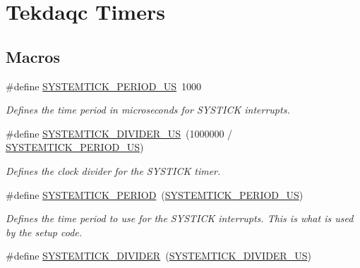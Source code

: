\hypertarget{group__tekdaqc__timers}{\section{Tekdaqc Timers}
\label{group__tekdaqc__timers}
}
\subsection*{Macros}
\begin{DoxyCompactItemize}
\item 
\hypertarget{group__tekdaqc__timers_gacc6f2ef6fc22ccd784d38b7de6f22492}{\#define \hyperlink{group__tekdaqc__timers_gacc6f2ef6fc22ccd784d38b7de6f22492}{S\-Y\-S\-T\-E\-M\-T\-I\-C\-K\-\_\-\-P\-E\-R\-I\-O\-D\-\_\-\-U\-S}~1000}\label{group__tekdaqc__timers_gacc6f2ef6fc22ccd784d38b7de6f22492}

\begin{DoxyCompactList}\small\item\em Defines the time period in microseconds for S\-Y\-S\-T\-I\-C\-K interrupts. \end{DoxyCompactList}\item 
\hypertarget{group__tekdaqc__timers_gad688df41f76297601fe702bd24190525}{\#define \hyperlink{group__tekdaqc__timers_gad688df41f76297601fe702bd24190525}{S\-Y\-S\-T\-E\-M\-T\-I\-C\-K\-\_\-\-D\-I\-V\-I\-D\-E\-R\-\_\-\-U\-S}~(1000000 / \hyperlink{group__tekdaqc__timers_gacc6f2ef6fc22ccd784d38b7de6f22492}{S\-Y\-S\-T\-E\-M\-T\-I\-C\-K\-\_\-\-P\-E\-R\-I\-O\-D\-\_\-\-U\-S})}\label{group__tekdaqc__timers_gad688df41f76297601fe702bd24190525}

\begin{DoxyCompactList}\small\item\em Defines the clock divider for the S\-Y\-S\-T\-I\-C\-K timer. \end{DoxyCompactList}\item 
\hypertarget{group__tekdaqc__timers_ga7061932395158f1a4988896f1b32a8b3}{\#define \hyperlink{group__tekdaqc__timers_ga7061932395158f1a4988896f1b32a8b3}{S\-Y\-S\-T\-E\-M\-T\-I\-C\-K\-\_\-\-P\-E\-R\-I\-O\-D}~(\hyperlink{group__tekdaqc__timers_gacc6f2ef6fc22ccd784d38b7de6f22492}{S\-Y\-S\-T\-E\-M\-T\-I\-C\-K\-\_\-\-P\-E\-R\-I\-O\-D\-\_\-\-U\-S})}\label{group__tekdaqc__timers_ga7061932395158f1a4988896f1b32a8b3}

\begin{DoxyCompactList}\small\item\em Defines the time period to use for the S\-Y\-S\-T\-I\-C\-K interrupts. This is what is used by the setup code. \end{DoxyCompactList}\item 
\hypertarget{group__tekdaqc__timers_gac55d476efeca526dcd924406fc9917bf}{\#define \hyperlink{group__tekdaqc__timers_gac55d476efeca526dcd924406fc9917bf}{S\-Y\-S\-T\-E\-M\-T\-I\-C\-K\-\_\-\-D\-I\-V\-I\-D\-E\-R}~(\hyperlink{group__tekdaqc__timers_gad688df41f76297601fe702bd24190525}{S\-Y\-S\-T\-E\-M\-T\-I\-C\-K\-\_\-\-D\-I\-V\-I\-D\-E\-R\-\_\-\-U\-S})}\label{group__tekdaqc__timers_gac55d476efeca526dcd924406fc9917bf}


\end{DoxyCompactItemize}
